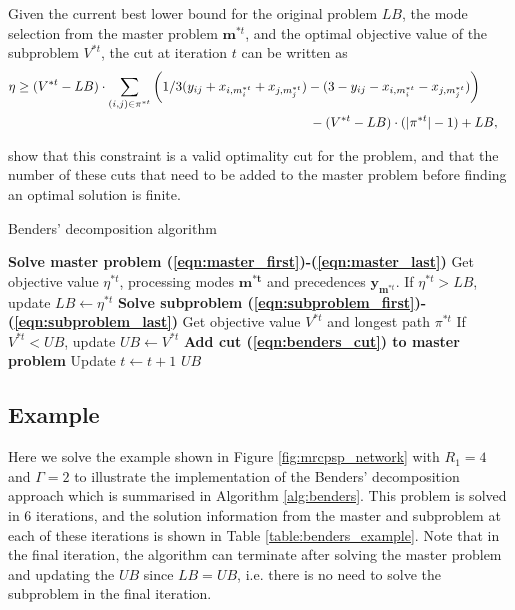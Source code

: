 \documentclass[a4paper,abstracton]{scrartcl}
\begin{document}
Given the current best lower bound for the original problem $LB$, the mode selection from the master problem $\bm{m}^{*t}$, and the optimal objective value of the subproblem $V^{*t}$, the cut at iteration $t$ can be written as
\begin{align}
	& \eta \geq (V^{*t} - LB)\cdot\sum_{(i,j)\in \pi^{*t}}\bigg(1/3 (y_{ij} + x_{i,m_i^{*t}} + x_{j,m_j^{*t}}) - (3 - y_{ij} - x_{i,m_i^{*t}} - x_{j,m_j^{*t}})\bigg) & \nonumber \\
	& \hspace{8.1cm} - (V^{*t} - LB)\cdot(|\pi^{*t}|-1) + LB,\label{eqn:benders_cut}
\end{align}

\cite{balouka2021robust} show that this constraint is a valid optimality cut for the problem, and that the number of these cuts that need to be added to the master problem before finding an optimal solution is finite.


\begin{algorithm}[h] 
\caption{Benders' decomposition algorithm}
\begin{algorithmic}[1]
	\State \textbf{Solve master problem (\ref{eqn:master_first})-(\ref{eqn:master_last})} 
	\State \hspace{\algorithmicindent} Get objective value $\eta^{*t}$, processing modes $\bm{m^{*t}}$ and precedences $\bm{y}_{\bm{m}^{*t}}$.
	\State \hspace{\algorithmicindent} If $\eta^{*t}>LB$, update $LB\leftarrow \eta^{*t}$ 
	\State \textbf{Solve subproblem (\ref{eqn:subproblem_first})-(\ref{eqn:subproblem_last})}
	\State \hspace{\algorithmicindent} Get objective value $V^{*t}$ and longest path $\pi^{*t}$
	\State \hspace{\algorithmicindent} If $V^{*t}<UB$, update $UB\leftarrow V^{*t}$
	\State \textbf{Add cut (\ref{eqn:benders_cut}) to master problem}
	\State Update $t\leftarrow t+1$
\EndWhile
\State \Return $UB$
\end{algorithmic}
\label{alg:benders}
\end{algorithm}

\subsection{Example}

Here we solve the example shown in Figure \ref{fig:mrcpsp_network} with $R_1=4$ and $\Gamma=2$ to illustrate the implementation of the Benders' decomposition approach which is summarised in Algorithm \ref{alg:benders}. This problem is solved in 6 iterations, and the solution information from the master and subproblem at each of these iterations is shown in Table \ref{table:benders_example}. Note that in the final iteration, the algorithm can terminate after solving the master problem and updating the $UB$ since $LB=UB$, i.e. there is no need to solve the subproblem in the final iteration.
\end{document}
